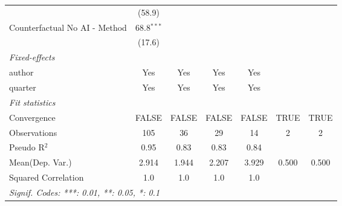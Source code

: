 \begin{tabular}{lcccccc}
                                 & (58.9)        &              &         &              &      &   \\   
   Counterfactual No AI - Method & 68.8$^{***}$  &              &         &              &      &   \\   
                                 & (17.6)        &              &         &              &      &   \\   
   \midrule
   \emph{Fixed-effects}\\
   author                        & Yes           & Yes          & Yes     & Yes          &      & \\  
   quarter                       & Yes           & Yes          & Yes     & Yes          &      & \\  
   \midrule
   \emph{Fit statistics}\\
   Convergence                   &FALSE          & FALSE        & FALSE   & FALSE        & TRUE & TRUE\\  
   Observations                  & 105           & 36           & 29      & 14           & 2    & 2\\  
   Pseudo R$^2$                  & 0.95          & 0.83         & 0.83    & 0.84         &      & \\  
Mean(Dep. Var.) & 2.914 & 1.944 & 2.207 & 3.929 & 0.500 & 0.500 \\
   Squared Correlation           & 1.0           & 1.0          & 1.0     & 1.0          &      & \\  
   \midrule \midrule
   \multicolumn{7}{l}{\emph{Signif. Codes: ***: 0.01, **: 0.05, *: 0.1}}\\
\end{tabular}
\par\endgroup
